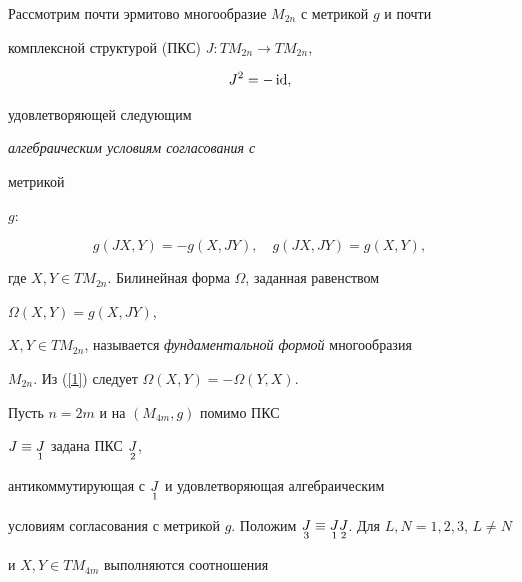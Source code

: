 \date{}




\pagestyle{plain} %







\maketitle


\label{begin}





Рассмотрим почти эрмитово многообразие $M_{2n}$ с метрикой $g$ и почти


комплексной структурой (ПКС) $J:TM_{2n}\to TM_{2n}$,


\begin{equation}


\label{1} J^2= -\id,


\end{equation}


удовлетворяющей следующим {\it алгебраическим условиям согласования с


метрикой} $g$:


$$


g(JX,Y)=-g(X,JY), \quad g(JX,JY)=g(X,Y),


$$


где $X,Y\in TM_{2n}$. Билинейная форма $\Omega$, заданная равенством


$\Omega (X,Y)=g(X,JY)$,


$X,Y\in TM_{2n}$, называется {\it фундаментальной формой} многообразия


$M_{2n}$. Из (\ref{1}) следует $\Omega (X,Y)=-\Omega(Y,X)$.





Пусть $n=2m$ и на $(M_{4m},g)$ помимо ПКС


$J\equiv \underset{1}{J}$ задана ПКС $\underset{2}{J}$,


антикоммутирующая с $\underset{1}{J}$ и удовлетворяющая алгебраическим


условиям согласования с метрикой $g$. Положим $\down{3}{J}\equiv


\down{1}{J}\down{2}{J}$. Для $L,N=1,2,3$, $L\neq N$


и $X,Y\in TM_{4m}$ выполняются соотношения


